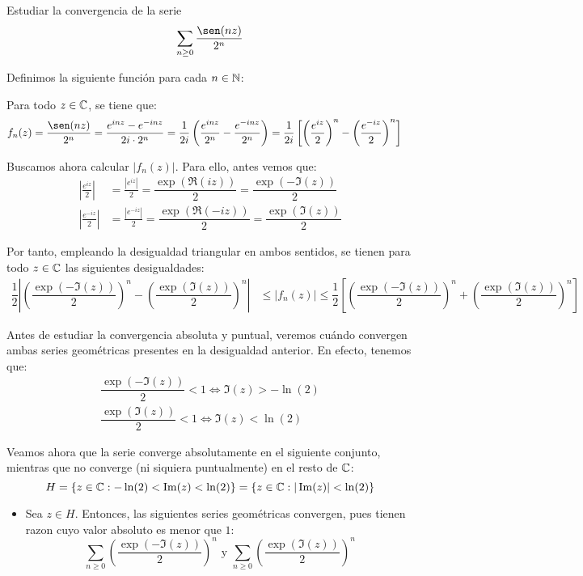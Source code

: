 \begin{ejercicio}
    Estudiar la convergencia de la serie
    \[
        \sum_{n\geq 0} \frac{\sen(nz)}{2^n}
    \]

    Definimos la siguiente función para cada $n\in \mathbb{N}$:

    Para todo $z\in \mathbb{C}$, se tiene que:
    \begin{align*}
        f_n(z) &= \frac{\sen(nz)}{2^n} = \frac{e^{inz}-e^{-inz}}{2i\cdot 2^n} = \frac{1}{2i}\left(\frac{e^{inz}}{2^n}-\frac{e^{-inz}}{2^n}\right) = \frac{1}{2i}\left[\left(\frac{e^{iz}}{2}\right)^{n}-\left(\frac{e^{-iz}}{2}\right)^{n}\right]
    \end{align*}

    Buscamos ahora calcular $|f_n(z)|$. Para ello, antes vemos que:
    \begin{align*}
        \left|\frac{e^{iz}}{2}\right| &= \frac{|e^{iz}|}{2} = \dfrac{\exp(\Re(iz))}{2} = \dfrac{\exp(-\Im(z))}{2}\\
        \left|\frac{e^{-iz}}{2}\right| &= \frac{|e^{-iz}|}{2} = \dfrac{\exp(\Re(-iz))}{2} = \dfrac{\exp(\Im(z))}{2}
    \end{align*}

    Por tanto, empleando la desigualdad triangular en ambos sentidos, se tienen para todo $z\in \mathbb{C}$ las siguientes desigualdades:
    \begin{align*}
        \dfrac{1}{2}\left|\left(\dfrac{\exp(-\Im(z))}{2}\right)^{n}-\left(\dfrac{\exp(\Im(z))}{2}\right)^{n}\right| &\leq |f_n(z)| \leq \dfrac{1}{2}\left[\left(\dfrac{\exp(-\Im(z))}{2}\right)^{n}+\left(\dfrac{\exp(\Im(z))}{2}\right)^{n}\right]
    \end{align*}

    Antes de estudiar la convergencia absoluta y puntual, veremos cuándo convergen ambas series geométricas presentes en la desigualdad anterior. En efecto, tenemos que:
    \begin{align*}
        \dfrac{\exp(-\Im(z))}{2}<1 \iff \Im(z) > -\ln(2)\\
        \dfrac{\exp(\Im(z))}{2}<1 \iff \Im(z) < \ln(2)
    \end{align*}

    Veamos ahora que la serie converge absolutamente en el siguiente conjunto, mientras que no converge (ni siquiera puntualmente) en el resto de $\mathbb{C}$:
    \begin{equation*}
        H=\left\{z\in \mathbb{C} : -\ln(2)<\operatorname{Im}(z)<\ln(2)\right\}=\left\{z\in \mathbb{C} : |\operatorname{Im}(z)|<\ln(2)\right\}
    \end{equation*}
    \begin{itemize}
        \item Sea $z\in H$. Entonces, las siguientes series geométricas convergen, pues tienen razon cuyo valor absoluto es menor que $1$:
        \begin{equation*}
            \sum_{n\geq 0}\left(\dfrac{\exp(-\Im(z))}{2}\right)^{n} \text{ y } \sum_{n\geq 0}\left(\dfrac{\exp(\Im(z))}{2}\right)^{n}
        \end{equation*}


\end{itemize}
\end{ejercicio}
